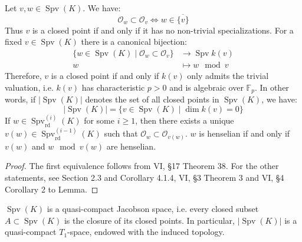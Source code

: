 \begin{lemma}\label{2.2-pre}
Let $v,w\in\operatorname{Spv}(K)$. We have:
\[\mathcal{O}_w\subset\mathcal{O}_v \iff w\in\overline{\{v\}} \]
Thus $v$ is a closed point if and only if it has no non-trivial specializations. For a fixed $v\in \operatorname{Spv}(K)$ there is a canonical bijection: 
\begin{align*}
\{ w\in\operatorname{Spv}(K)\mid \mathcal{O}_w\subset\mathcal{O}_v \} &\longrightarrow \operatorname{Spv}k(v)\\ 
w&\longmapsto w\mod v
\end{align*}
Therefore, $v$ is a closed point if and only if $k(v)$ only admits the trivial valuation, i.e. $k(v)$ has characteristic $p>0$ and is algebraic over $\mathbb{F}_p$. In other words, if $|\operatorname{Spv}(K)|$ denotes the set of all closed points in $\operatorname{Spv}(K)$, we have:
\[ |\operatorname{Spv}(K)|=\{v\in\operatorname{Spv}(K)\mid \dim k(v)=0\} \]
If $w\in\operatorname{Spv}_\text{rd}^{(i)}(K)$ for some $i\geq 1$, then there exists a unique $v(w)\in\operatorname{Spv}_\text{rd}^{(i-1)}(K)$ such that $\mathcal{O}_w\subset\mathcal{O}_{v(w)}$. $w$ is henselian if and only if $v(w)$ and $w\mod v(w)$ are henselian.
\end{lemma}

\begin{proof}
The first equivalence follows from \cite{ZS60} VI, §17 Theorem 38. For the other statements, see \cite{EP05} Section 2.3 and Corollary 4.1.4, \cite{ZS60} VI, §3 Theorem 3 and VI, §4 Corollary 2 to Lemma.
\end{proof}

\begin{lemma}\label{spv-topology}
$\operatorname{Spv}(K)$ is a quasi-compact Jacobson space, i.e. every closed subset $A\subset\operatorname{Spv}(K)$ is the closure of its closed points. In particular, $|\operatorname{Spv}(K)|$ is a quasi-compact $T_1$-space, endowed with the induced topology. 
\end{lemma}

